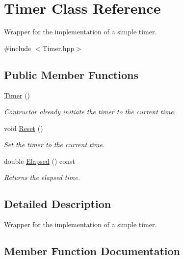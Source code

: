 \hypertarget{class_timer}{}\section{Timer Class Reference}
\label{class_timer}


Wrapper for the implementation of a simple timer.  




{\ttfamily \#include $<$Timer.\+hpp$>$}

\subsection*{Public Member Functions}
\begin{DoxyCompactItemize}
\item 
\hyperlink{class_timer_a5f16e8da27d2a5a5242dead46de05d97}{Timer} ()\hypertarget{class_timer_a5f16e8da27d2a5a5242dead46de05d97}{}\label{class_timer_a5f16e8da27d2a5a5242dead46de05d97}

\begin{DoxyCompactList}\small\item\em Contructor already initiate the timer to the current time. \end{DoxyCompactList}\item 
void \hyperlink{class_timer_ae7c0c1e7d12de4b8a6e7c64e451cdd2a}{Reset} ()\hypertarget{class_timer_ae7c0c1e7d12de4b8a6e7c64e451cdd2a}{}\label{class_timer_ae7c0c1e7d12de4b8a6e7c64e451cdd2a}

\begin{DoxyCompactList}\small\item\em Set the timer to the current time. \end{DoxyCompactList}\item 
double \hyperlink{class_timer_a8bb6cb4f5813c7a3aea3c37f8bcbf0ea}{Elapsed} () const 
\begin{DoxyCompactList}\small\item\em Returns the elapsed time. \end{DoxyCompactList}\end{DoxyCompactItemize}


\subsection{Detailed Description}
Wrapper for the implementation of a simple timer. 

\subsection{Member Function Documentation}
